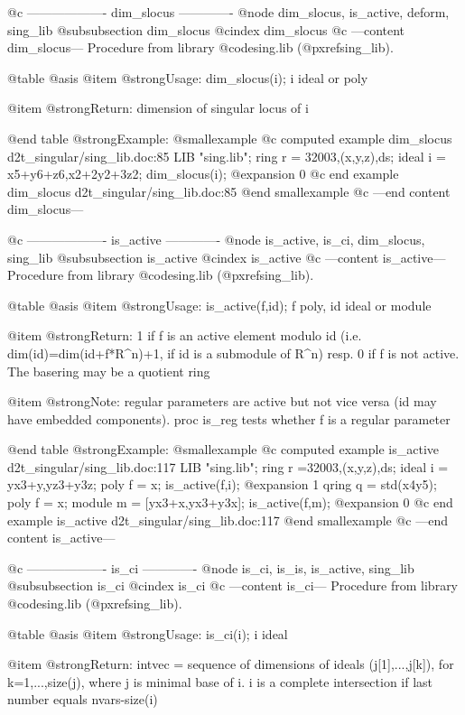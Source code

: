 @c ------------------- dim_slocus -------------
@node dim_slocus, is_active, deform, sing_lib
@subsubsection dim_slocus
@cindex dim_slocus
@c ---content dim_slocus---
Procedure from library @code{sing.lib} (@pxref{sing_lib}).

@table @asis
@item @strong{Usage:}
dim_slocus(i); i ideal or poly

@item @strong{Return:}
dimension of singular locus of i

@end table
@strong{Example:}
@smallexample
@c computed example dim_slocus d2t_singular/sing_lib.doc:85 
LIB "sing.lib";
ring r  = 32003,(x,y,z),ds;
ideal i = x5+y6+z6,x2+2y2+3z2;
dim_slocus(i);
@expansion{} 0
@c end example dim_slocus d2t_singular/sing_lib.doc:85
@end smallexample
@c ---end content dim_slocus---

@c ------------------- is_active -------------
@node is_active, is_ci, dim_slocus, sing_lib
@subsubsection is_active
@cindex is_active
@c ---content is_active---
Procedure from library @code{sing.lib} (@pxref{sing_lib}).

@table @asis
@item @strong{Usage:}
is_active(f,id); f poly, id ideal or module

@item @strong{Return:}
1 if f is an active element modulo id (i.e. dim(id)=dim(id+f*R^n)+1,
if id is a submodule of R^n) resp. 0 if f is not active.
The basering may be a quotient ring

@item @strong{Note:}
regular parameters are active but not vice versa (id may have embedded
components). proc is_reg tests whether f is a regular parameter

@end table
@strong{Example:}
@smallexample
@c computed example is_active d2t_singular/sing_lib.doc:117 
LIB "sing.lib";
ring r   =32003,(x,y,z),ds;
ideal i  = yx3+y,yz3+y3z;
poly f   = x;
is_active(f,i);
@expansion{} 1
qring q  = std(x4y5);
poly f   = x;
module m = [yx3+x,yx3+y3x];
is_active(f,m);
@expansion{} 0
@c end example is_active d2t_singular/sing_lib.doc:117
@end smallexample
@c ---end content is_active---

@c ------------------- is_ci -------------
@node is_ci, is_is, is_active, sing_lib
@subsubsection is_ci
@cindex is_ci
@c ---content is_ci---
Procedure from library @code{sing.lib} (@pxref{sing_lib}).

@table @asis
@item @strong{Usage:}
is_ci(i); i ideal

@item @strong{Return:}
intvec = sequence of dimensions of ideals (j[1],...,j[k]), for
k=1,...,size(j), where j is minimal base of i. i is a complete
intersection if last number equals nvars-size(i)

